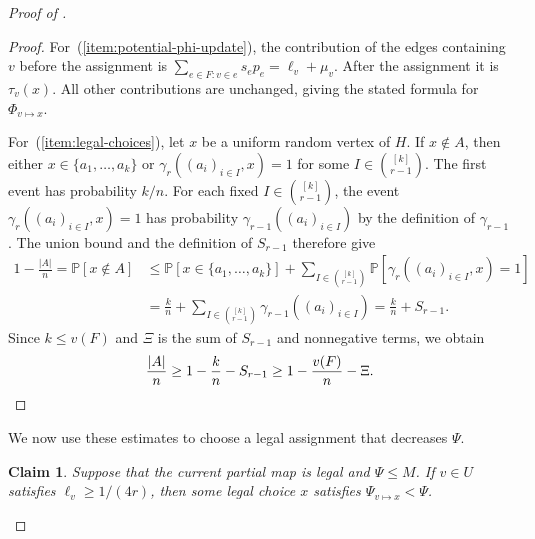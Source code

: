 \documentclass[10pt]{article}
\numberwithin{equation}{section}
\newtheorem{claim}[claim]{Claim}
\newcommand{\Prb}{\mathbb P}
\begin{document}
\begin{proof}[Proof of ]
\begin{proof}
For~(\ref{item:potential-phi-update}), the contribution of the edges containing $v$ before the assignment is $\sum_{e\in F\colon v\in e}s_ep_e=\ell_v+\mu_v$. After the assignment it is $\tau_v(x)$. All other contributions are unchanged, giving the stated formula for $\Phi_{v\mapsto x}$.

For~(\ref{item:legal-choices}), let $x$ be a uniform random vertex of $H$. If $x\notin A$, then either $x\in\{a_1,\ldots,a_k\}$ or $\gamma_r((a_i)_{i\in I},x)=1$ for some $I\in\binom{[k]}{r-1}$. The first event has probability $k/n$. For each fixed $I\in\binom{[k]}{r-1}$, the event $\gamma_r((a_i)_{i\in I},x)=1$ has probability $\gamma_{r-1}((a_i)_{i\in I})$ by the definition of $\gamma_{r-1}$. The union bound and the definition of $S_{r-1}$ therefore give
\[
\begin{aligned}
1-\frac{|A|}{n}
=\Prb[x\notin A]
&\le\Prb[x\in\{a_1,\ldots,a_k\}]
+\sum_{I\in\binom{[k]}{r-1}}
\Prb[\gamma_r((a_i)_{i\in I},x)=1]\\
&=\frac{k}{n}
+\sum_{I\in\binom{[k]}{r-1}}\gamma_{r-1}((a_i)_{i\in I})
=\frac{k}{n}+S_{r-1}.
\end{aligned}
\]
Since $k\le v(F)$ and $\Xi$ is the sum of $S_{r-1}$ and nonnegative terms, we obtain
\[
\frac{|A|}{n}\ge1-\frac{k}{n}-S_{r-1}
\ge1-\frac{v(F)}n-\Xi.\qedhere
\]
\end{proof}

We now use these estimates to choose a legal assignment that decreases $\Psi$.

\begin{claim}\label{lem:one-step}
Suppose that the current partial map is legal and $\Psi\le M$. If $v\in U$ satisfies $\ell_v\ge1/(4r)$, then some legal choice $x$ satisfies $\Psi_{v\mapsto x}<\Psi$.
\end{claim}


\end{proof}
\end{document}
